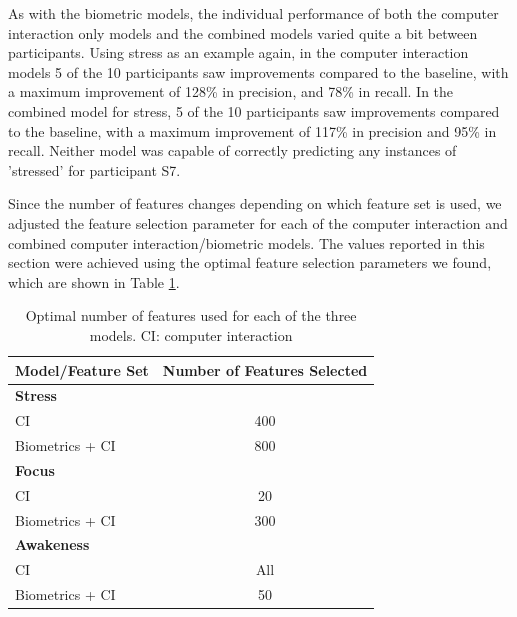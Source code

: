 As with the biometric models, the individual performance of both the computer interaction only models and the combined models varied quite a bit between participants. Using stress as an example again, in the computer interaction models 5 of the 10 participants saw improvements compared to the baseline, with a maximum improvement of 128\% in precision, and 78\% in recall. In the combined model for stress, 5 of the 10 participants saw improvements compared to the baseline, with a maximum improvement of 117\% in precision and 95\% in recall. Neither model was capable of correctly predicting any instances of 'stressed' for participant S7.

Since the number of features changes  depending on which feature set is used, we adjusted the feature selection parameter for each of the computer interaction and combined computer interaction/biometric models. The values reported in this section were achieved using the optimal feature selection parameters we found, which are shown in Table \ref{ciFeatureSelection}.

\begin{table}
\begin{center}
\begin{tabularx}{\columnwidth}{lc}
\hline
Model/Feature Set & Number of Features Selected\\
\hline
\textbf{Stress}\\
\hspace{3mm}CI & 400\\
\hspace{3mm}Biometrics + CI & 800\\
\hline
\textbf{Focus}\\
\hspace{3mm}CI & 20\\
\hspace{3mm}Biometrics + CI & 300\\
\hline
\textbf{Awakeness}\\
\hspace{3mm}CI & All\\
\hspace{3mm}Biometrics + CI & 50\\
\hline
\end{tabularx}
\caption{Optimal number of features used for each of the three models. CI: computer interaction}
\label{ciFeatureSelection}
\end{center}
\vspace*{-7mm}
\end{table}

